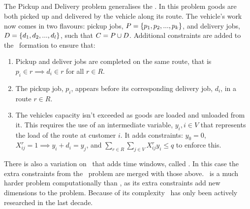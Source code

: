 \subsection{\PDP}

The Pickup and Delivery problem generalises the \VRP. In this problem goods are both picked up and delivered by the vehicle along its route. The vehicle's work now comes in two flavours: pickup jobs, $P = \{p_1,p_2,...,p_k\}$, and delivery jobs, $D = \{d_1,d_2,...,d_l\}$, such that $C = P \cup D$. Additional constraints are added to the \CVRP\ formation to ensure that:

\begin{enumerate}
   \item Pickup and deliver jobs are completed on the same route, that is $p_i \in r \implies d_i \in r$ for all $r \in R$.

   \item The pickup job, $p_i$, appears before its corresponding delivery job, $d_i$, in a route $r \in R$.

   \item The vehicles capacity isn't exceeded as goods are loaded and unloaded from it. This requires the use of an intermediate variable, $y_i, i \in V$ that represents the load of the route at customer $i$. It adds constraints: $y_0 = 0$, $X_{ij}^r = 1 \implies y_i + d_i = y_j$, and $\sum_{r \in R} \sum_{j \in V} X_{ij}^r y_i \leq q$ to enforce this.
   
\end{enumerate}

There is also a variation on \PDP\ that adds time windows, called \PDPTW. In this case the extra constraints from the \VRPTW\ problem are merged with those above. \PDP\ is a much harder problem computationally than \CVRP, as its extra constraints add new dimensions to the problem. Because of its complexity \PDP\ has only been actively researched in the last decade. 


